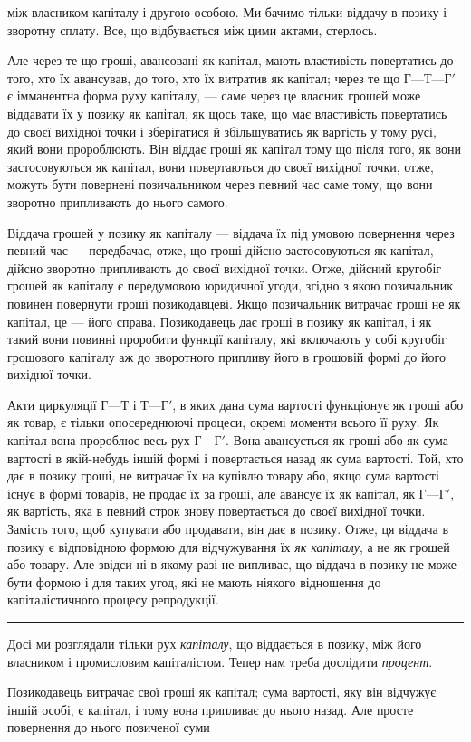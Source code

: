 \parcont{}  %
між власником капіталу і другою особою. Ми бачимо тільки
віддачу в позику і зворотну сплату. Все, що відбувається між
цими актами, стерлось.

Але через те що гроші, авансовані як капітал, мають властивість
повертатись до того, хто їх авансував, до того, хто
їх витратив як капітал; через те що $Г — Т — Г'$ є імманентна форма
руху капіталу, — саме через це власник грошей може віддавати
їх у позику як капітал, як щось таке, що має властивість повертатись
до своєї вихідної точки і зберігатися й збільшуватись як
вартість у тому русі, який вони пророблюють. Він віддає гроші як
капітал тому що після того, як вони застосовуються як капітал,
вони повертаються до своєї вихідної точки, отже, можуть бути
повернені позичальником через певний час саме тому, що вони
зворотно припливають до нього самого.

Віддача грошей у позику як капіталу — віддача їх під умовою
повернення через певний час — передбачає, отже, що гроші
дійсно застосовуються як капітал, дійсно зворотно припливають
до своєї вихідної точки. Отже, дійсний кругобіг грошей
як капіталу є передумовою юридичної угоди, згідно з якою
позичальник повинен повернути гроші позикодавцеві. Якщо позичальник
витрачає гроші не як капітал, це — його справа. Позикодавець
дає гроші в позику як капітал, і як такий вони повинні
проробити функції капіталу, які включають у собі кругобіг грошового
капіталу аж до зворотного припливу його в грошовій
формі до його вихідної точки.

Акти циркуляції $Г — Т$ і $Т — Г'$, в яких дана сума вартості функціонує
як гроші або як товар, є тільки опосереднюючі процеси,
окремі моменти всього її руху. Як капітал вона пророблює весь
рух $Г — Г'$. Вона авансується як гроші або як сума вартості
в якій-небудь іншій формі і повертається назад як сума вартості.
Той, хто дає в позику гроші, не витрачає їх на купівлю товару
або, якщо сума вартості існує в формі товарів, не продає їх за
гроші, але авансує їх як капітал, як $Г — Г'$, як вартість, яка
в певний строк знову повертається до своєї вихідної точки.
Замість того, щоб купувати або продавати, він дає в позику.
Отже, ця віддача в позику є відповідною формою для відчужування
їх \emph{як капіталу}, а не як грошей або товару. Але звідси ні
в якому разі не випливає, що віддача в позику не може бути
формою і для таких угод, які не мають ніякого відношення до
капіталістичного процесу репродукції.

\pfbreak{}

Досі ми розглядали тільки рух \emph{капіталу}, що віддається в позику,
між його власником і промисловим капіталістом. Тепер
нам треба дослідити \emph{процент}.

Позикодавець витрачає свої гроші як капітал; сума вартості,
яку він відчужує іншій особі, є капітал, і тому вона припливає
до нього назад. Але просте повернення до нього позиченої суми
\parbreak{}  %
